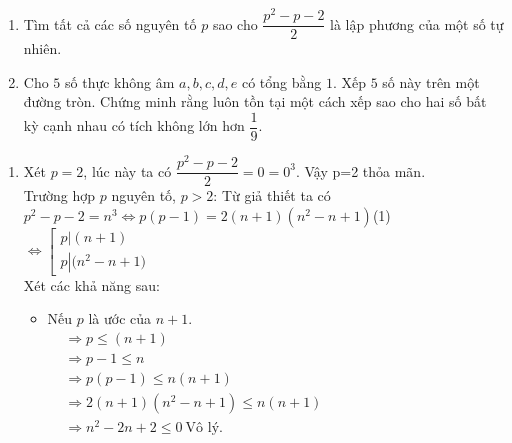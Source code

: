\begin{ex}%
	\hfill
    \begin{enumerate}
    	\item Tìm tất cả các số nguyên tố $p$ sao cho $\dfrac{p^2-p-2}{2}$ là lập phương của một số tự nhiên.
    	\item Cho $5$ số thực không âm $a, b, c, d, e$ có tổng bằng $1$. Xếp $5$ số này trên một đường tròn. Chứng minh rằng luôn tồn tại một cách xếp sao cho hai số bất kỳ cạnh nhau có tích không lớn hơn $\dfrac{1}{9}$.
    \end{enumerate}
\loigiai
    {
        \begin{enumerate}
        	\item Xét $p=2$, lúc này ta có $\dfrac{p^2-p-2}{2}=0=0^3$. Vậy p=2 thỏa mãn.\\
        	Trường hợp $p$ nguyên tố, $p>2$: Từ giả thiết ta có \\
                	$p^2-p-2=n^3 \Leftrightarrow p(p-1)=2(n+1)(n^2-n+1)$(1)\\
                	$\Leftrightarrow \left[ \begin{array}{l}
                	p\left| {(n + 1)} \right.\\
                	p\left| {({n^2} - n + 1}) \right.
                	\end{array} \right.$ \\
                	Xét các khả năng sau:
       \begin{itemize}
                		\item Nếu $p$ là ước của $n+1$. \\
                		$
                		\begin{aligned}
                			&\Rightarrow p\le (n+1) \\
                			&\Rightarrow p-1 \le n\\
                			&\Rightarrow p(p-1)\le n(n+1)\\
                			&\Rightarrow 2(n+1)(n^2-n+1) \le n(n+1)\\
                			&\Rightarrow n^2-2n+2\le 0\ \mbox{Vô lý}.
                		\end{aligned}
                		$
                	

\end{itemize}
\end{enumerate}}
\end{ex}
